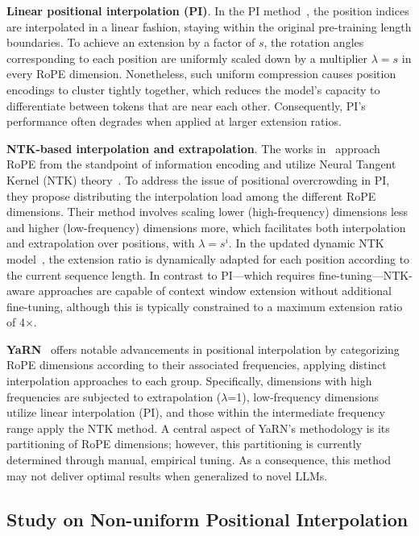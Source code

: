 \textbf{Linear positional interpolation (PI)}. In the PI method~\cite{pi}, the position indices are interpolated in a linear fashion, staying within the original pre-training length boundaries. To achieve an extension by a factor of $s$, the rotation angles corresponding to each position are uniformly scaled down by a multiplier $\lambda=s$ in every RoPE dimension. Nonetheless, such uniform compression causes position encodings to cluster tightly together, which reduces the model's capacity to differentiate between tokens that are near each other. Consequently, PI's performance often degrades when applied at larger extension ratios.

\textbf{NTK-based interpolation and extrapolation}. The works in~\cite{ntk,dynamicntk} approach RoPE from the standpoint of information encoding and utilize Neural Tangent Kernel (NTK) theory~\cite{jacot2018neural,tancik2020fourier}. To address the issue of positional overcrowding in PI, they propose distributing the interpolation load among the different RoPE dimensions. Their method involves scaling lower (high-frequency) dimensions less and higher (low-frequency) dimensions more, which facilitates both interpolation and extrapolation over positions, with $\lambda=s^{i}$. In the updated dynamic NTK model~\cite{dynamicntk}, the extension ratio is dynamically adapted for each position according to the current sequence length. In contrast to PI—which requires fine-tuning—NTK-aware approaches are capable of context window extension without additional fine-tuning, although this is typically constrained to a maximum extension ratio of 4$\times$.

\textbf{YaRN}~\cite{yarn} offers notable advancements in positional interpolation by categorizing RoPE dimensions according to their associated frequencies, applying distinct interpolation approaches to each group. Specifically, dimensions with high frequencies are subjected to extrapolation ($\lambda$=1), low-frequency dimensions utilize linear interpolation (PI), and those within the intermediate frequency range apply the NTK method. A central aspect of YaRN’s methodology is its partitioning of RoPE dimensions; however, this partitioning is currently determined through manual, empirical tuning. As a consequence, this method may not deliver optimal results when generalized to novel LLMs.

\subsection{Study on Non-uniform Positional Interpolation}

